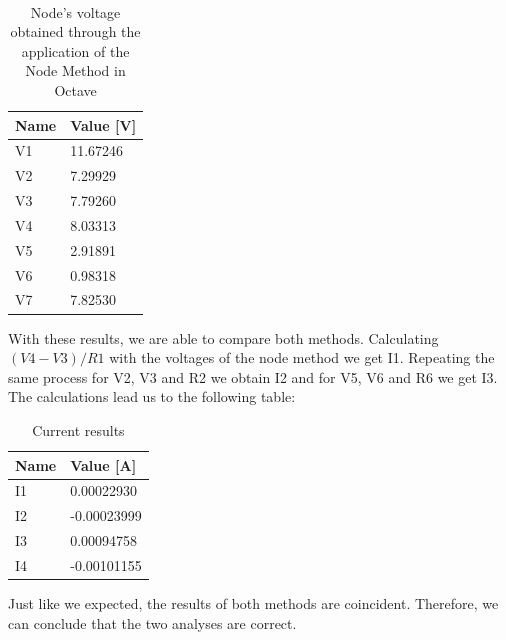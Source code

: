 \documentclass[11en, a4paper, oneside]{article}
\begin{document}
\paragraph{}
\begin{table}[ht]
\begin{center}
\begin{tabular}{|l|l|}
\hline
\textbf{Name} & \textbf{Value {[}V{]}} \\ \hline
V1            & 11.67246               \\ \hline
V2            & 7.29929                \\ \hline
V3            & 7.79260                \\ \hline
V4            & 8.03313                \\ \hline
V5            & 2.91891                \\ \hline
V6            & 0.98318                \\ \hline
V7            & 7.82530                \\ \hline
\end{tabular}
\caption{Node's voltage obtained through the application of the Node Method in Octave}
\end{center}
\end{table}

\par With these results, we are able to compare both methods. Calculating $(V4-V3)/R1$ with the voltages of the node method we get I1. Repeating the same process for V2, V3 and R2 we obtain I2 and for V5, V6 and R6 we get I3. The calculations lead us to the following table:

\begin{table}[ht]
\begin{center}
    \begin{tabular}{|l|l|}
\hline
\textbf{Name} & \textbf{Value {[}A{]}} \\ \hline
I1            & 0.00022930             \\ \hline
I2            & -0.00023999            \\ \hline
I3            & 0.00094758             \\ \hline
I4            & -0.00101155            \\ \hline
\end{tabular}
\caption{Current results}
\end{center}
\end{table}

Just like we expected, the results of both methods are coincident. Therefore, we can conclude that the two analyses are correct.
\end{document}
